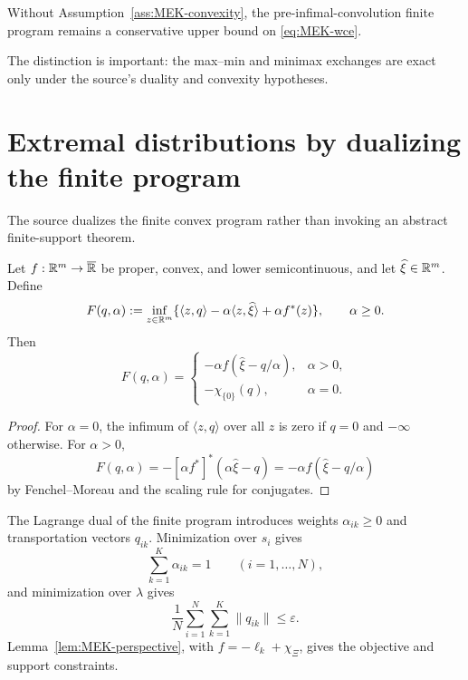 \begin{corollary}\label{cor:MEK-upper-reduction}
Without Assumption~\ref{ass:MEK-convexity}, the pre-infimal-convolution finite program remains a conservative upper bound on \eqref{eq:MEK-wce}.
\end{corollary}
The distinction is important: the max--min and minimax exchanges are exact only under the source's duality and convexity hypotheses.

\section{Extremal distributions by dualizing the finite program}
The source dualizes the finite convex program rather than invoking an abstract finite-support theorem.

\begin{lemma}\label{lem:MEK-perspective}
Let $f:\mathbb{R}^m\to\overline{\mathbb{R}}$ be proper, convex, and lower semicontinuous, and let $\widehat\xi\in\mathbb{R}^m$.  Define
\[
 F(q,\alpha)
 :=\inf_{z\in\mathbb{R}^m}
 \{\langle z,q\rangle
 -\alpha\langle z,\widehat\xi\rangle
 +\alpha f^*(z)\},
 \qquad \alpha\ge0.
\]
Then
\begin{equation}\label{eq:MEK-perspective}
 F(q,\alpha)=
 \begin{cases}
 -\alpha f(\widehat\xi-q/\alpha),&\alpha>0,\\
 -\chi_{\{0\}}(q),&\alpha=0.
 \end{cases}
\end{equation}
\end{lemma}
\begin{proof}
For $\alpha=0$, the infimum of $\langle z,q\rangle$ over all $z$ is zero if $q=0$ and $-\infty$ otherwise.  For $\alpha>0$,
\[
 F(q,\alpha)
 =-[\alpha f^*]^*(\alpha\widehat\xi-q)
 =-\alpha f(\widehat\xi-q/\alpha)
\]
by Fenchel--Moreau and the scaling rule for conjugates.
\end{proof}

The Lagrange dual of the finite program introduces weights $\alpha_{ik}\ge0$ and transportation vectors $q_{ik}$.  Minimization over $s_i$ gives
\[
 \sum_{k=1}^K\alpha_{ik}=1
 \qquad(i=1,\dots,N),
\]
and minimization over $\lambda$ gives
\[
 \frac1N\sum_{i=1}^N\sum_{k=1}^K\|q_{ik}\|\le\varepsilon.
\]
Lemma~\ref{lem:MEK-perspective}, with $f=-\ell_k+\chi_\Xi$, gives the objective and support constraints.

